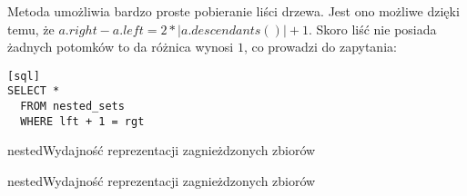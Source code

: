 Metoda umożliwia bardzo proste pobieranie liści drzewa. 
Jest ono możliwe dzięki temu, że $a.right - a.left = 2 * |a.descendants()| + 1$. 
Skoro liść nie posiada żadnych potomków to da różnica wynosi $1$, co prowadzi do zapytania: 
\begin{verbatim}[sql]
SELECT *
  FROM nested_sets
  WHERE lft + 1 = rgt
\end{verbatim}



\begin{qxtab}{nested}{Wydajność reprezentacji zagnieżdzonych zbiorów}
\end{qxtab}

\begin{qxfig}{nested}{Wydajność reprezentacji zagnieżdzonych zbiorów}
\end{qxfig}

